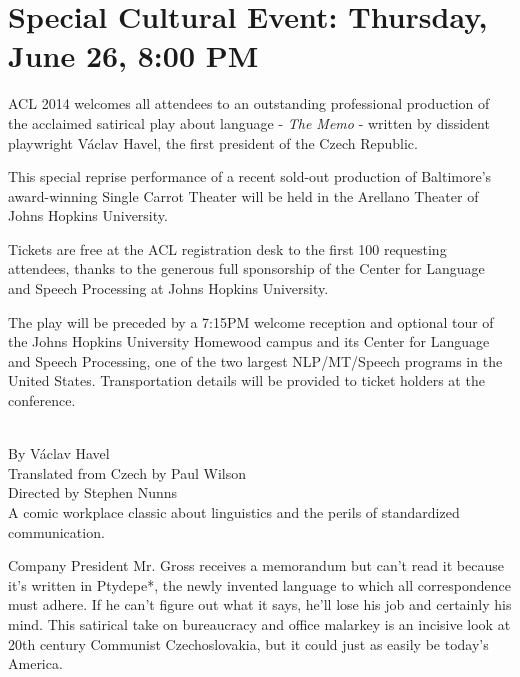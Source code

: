 \clearpage
\section*{Special Cultural Event: Thursday, June 26, 8:00 PM}

ACL 2014 welcomes all attendees to an outstanding professional production of the acclaimed satirical play about language - {\it The Memo} - written by dissident playwright V\'{a}clav Havel, the first president of the Czech Republic.

This special reprise performance of a recent sold-out production of Baltimore's award-winning Single Carrot Theater will be held in the Arellano Theater of Johns Hopkins University.

Tickets are free at the ACL registration desk to the first 100 requesting attendees, thanks to the generous full sponsorship of the Center for Language and Speech Processing at Johns Hopkins University.

The play will be preceded by a 7:15PM welcome reception and optional tour of the Johns Hopkins University Homewood campus and its Center for Language and Speech Processing, one of the two largest NLP/MT/Speech programs in the United States.  Transportation details will be provided to ticket holders at the conference.

\noindent\makebox[\linewidth]{\rule{4in}{0.4pt}}

 \\
\noindent By Václav Havel \\

\noindent Translated from Czech by Paul Wilson \\
\noindent Directed by Stephen Nunns \\

A comic workplace classic about linguistics and the perils of standardized communication.

Company President Mr. Gross receives a memorandum but can’t read it because it’s written in Ptydepe*, the newly invented language to which all correspondence must adhere. If he can’t figure out what it says, he’ll lose his job and certainly his mind. This satirical take on bureaucracy and office malarkey is an incisive look at 20th century Communist Czechoslovakia, but it could just as easily be today’s America.

